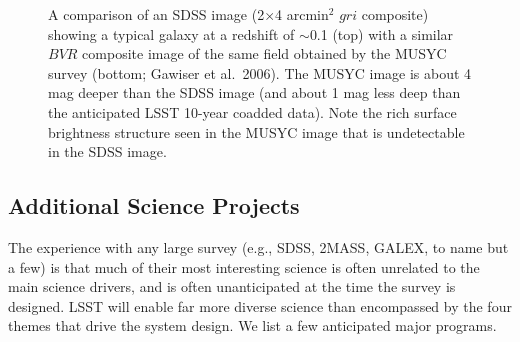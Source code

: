 \begin{figure}
\vskip -1in
\caption{
A comparison of an SDSS image (2$\times$4 arcmin$^2$ $gri$ composite) showing a typical galaxy at
a redshift of $\sim$0.1 (top) with a similar $BVR$ composite image of the same field obtained by the MUSYC survey (bottom;
Gawiser et al.~2006). The MUSYC image is about 4 mag deeper than the SDSS image (and about 1 mag less deep
than the anticipated LSST 10-year coadded data). Note the rich surface brightness structure seen in the MUSYC
image that is undetectable in the SDSS image.}
\label{Fig:musyc}
\end{figure}


\subsection{  Additional Science Projects}

The experience with any large survey (e.g., SDSS, 2MASS, GALEX, to name but a
few) is that much of their most interesting science is often unrelated to
the main science drivers, and is often unanticipated at the time the survey is
designed. LSST will enable far more diverse science than encompassed by the
four themes that drive the system design. We list a few anticipated major
programs.

